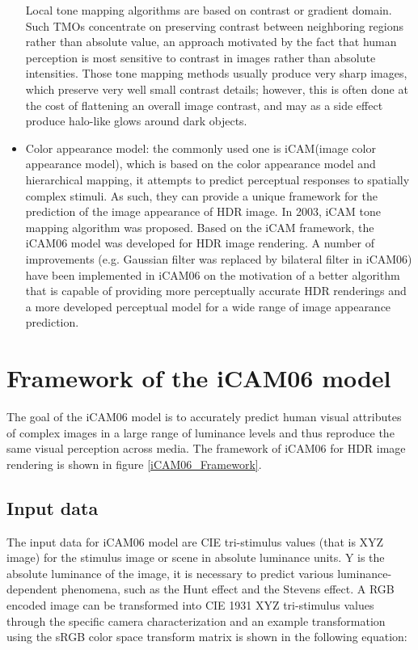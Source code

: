 \documentclass[10pt,twocolumn,letterpaper]{article}
\begin{document}
\begin{itemize}
Local tone mapping algorithms are based on contrast or gradient domain. Such TMOs concentrate on preserving contrast between neighboring regions rather than absolute value, an approach motivated by the fact that human perception is most sensitive to contrast in images rather than absolute intensities. Those tone mapping methods usually produce very sharp images, which preserve very well small contrast details; however, this is often done at the cost of flattening an overall image contrast, and may as a side effect produce halo-like glows around dark objects\cite{devlin2002star}.

\item Color appearance model: the commonly used one is iCAM(image color appearance model), which is based on the color appearance model and hierarchical mapping\cite{fairchild2004icam}, it attempts to predict perceptual responses to spatially complex stimuli. As such, they can provide a unique framework for the prediction of the image appearance of HDR image. In 2003, iCAM tone mapping algorithm was proposed\cite{johnson2003rendering}. Based on the iCAM framework, the iCAM06 model was developed for HDR image rendering. A number of improvements (e.g. Gaussian filter was replaced by bilateral filter in iCAM06) have been implemented in iCAM06 on the motivation of a better algorithm that is capable of providing more perceptually accurate HDR renderings and a more developed perceptual model for a wide range of image appearance prediction\cite{kuang2007icam06}. 

\end{itemize}

\section{Framework of the iCAM06 model}

The goal of the iCAM06 model is to accurately predict human visual attributes of complex images in a large range of luminance levels and thus reproduce the same visual perception across media. The framework of iCAM06 for HDR image rendering is shown in figure \ref{iCAM06_Framework}. 

\subsection{Input data}
\label{sec:parta}
The input data for iCAM06 model are CIE tri-stimulus values (that is XYZ image) for the stimulus image or scene in absolute luminance units. Y is the absolute luminance of the image, it is necessary to predict various luminance-dependent phenomena, such as the Hunt effect and the Stevens effect. A RGB encoded image can be transformed into CIE 1931 XYZ tri-stimulus values through the specific camera characterization and an example transformation using the sRGB color space transform matrix is shown in the following equation:
\end{document}
